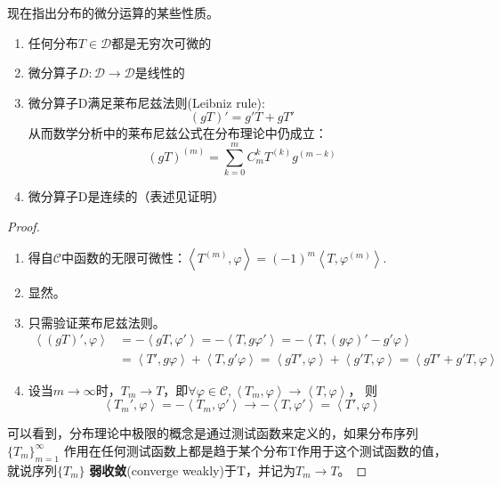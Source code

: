 现在指出分布的微分运算的某些性质\cite{zorich}。
\begin{theorem}[分布的微分运算的性质]
    \begin{enumerate}
        \quad
    \item 任何分布$T\in\mathcal{D} $都是无穷次可微的
    \item 微分算子$D:\mathcal{D} \to\mathcal{D} $是线性的
    \item 微分算子D满足莱布尼兹法则(Leibniz rule):
          \[\left(gT\right)'=g'T+gT'\]从而数学分析中的莱布尼兹公式在分布理论中仍成立：
          \[\left(gT\right)^{(m)}=\sum_{k=0}^{m}C_m^k T^{(k)}g^{(m-k)}\]
    \item 微分算子D是连续的（表述见证明）
\end{enumerate}
\end{theorem}
\begin{proof}
\begin{enumerate}
    \item 得自$\mathcal{C} $中函数的无限可微性：$\left\langle T^{(m)},\varphi\right\rangle=(-1)^m\left\langle T,\varphi^{(m)}\right\rangle$.
    \item 显然。
    \item 只需验证莱布尼兹法则。
          \begin{align*}
              \left\langle (gT)',\varphi\right\rangle & =-\left\langle gT,\varphi'\right\rangle=-\left\langle T,g\varphi'\right\rangle=-\left\langle T,(g\varphi)'-g'\varphi\right\rangle                                            \\
                                           & =\left\langle T',g\varphi\right\rangle+\left\langle T,g'\varphi\right\rangle=\left\langle gT',\varphi\right\rangle+\left\langle g'T,\varphi\right\rangle=\left\langle gT'+g'T,\varphi\right\rangle
          \end{align*}
    \item 设当$m\to\infty$时，$T_m\to T$，即$\forall\varphi\in\mathcal{C} ,\left\langle T_m,\varphi\right\rangle\to\left\langle T,\varphi\right\rangle$，
          则\[\left\langle T_m',\varphi\right\rangle=-\left\langle T_m,\varphi'\right\rangle\to-\left\langle T,\varphi'\right\rangle=\left\langle T',\varphi\right\rangle\]
\end{enumerate}
可以看到，分布理论中极限的概念是通过测试函数来定义的，如果分布序列$\{T_m\}_{m=1}^{\infty}$
作用在任何测试函数上都是趋于某个分布T作用于这个测试函数的值，就说序列$\{T_m\}$
\textbf{弱收敛}(converge weakly)于T，并记为$T_m\to T$\cite{folland}。
\end{proof}

